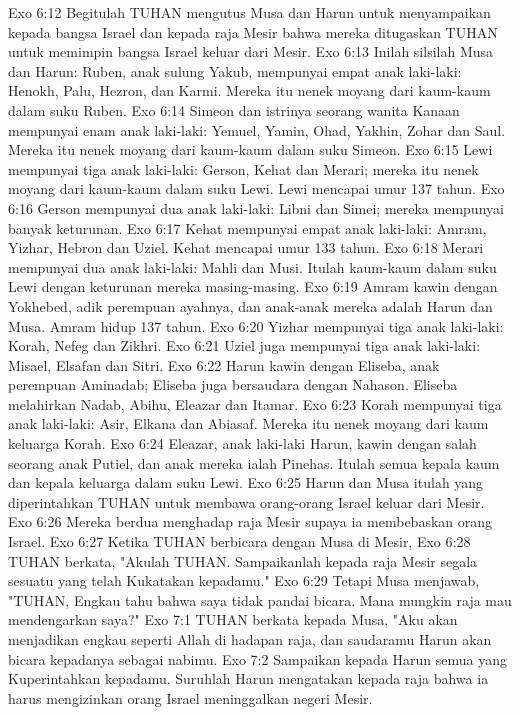Exo 6:12  Begitulah TUHAN mengutus Musa dan Harun untuk menyampaikan kepada bangsa Israel dan kepada raja Mesir bahwa mereka ditugaskan TUHAN untuk memimpin bangsa Israel keluar dari Mesir.
Exo 6:13  Inilah silsilah Musa dan Harun: Ruben, anak sulung Yakub, mempunyai empat anak laki-laki: Henokh, Palu, Hezron, dan Karmi. Mereka itu nenek moyang dari kaum-kaum dalam suku Ruben.
Exo 6:14  Simeon dan istrinya seorang wanita Kanaan mempunyai enam anak laki-laki: Yemuel, Yamin, Ohad, Yakhin, Zohar dan Saul. Mereka itu nenek moyang dari kaum-kaum dalam suku Simeon.
Exo 6:15  Lewi mempunyai tiga anak laki-laki: Gerson, Kehat dan Merari; mereka itu nenek moyang dari kaum-kaum dalam suku Lewi. Lewi mencapai umur 137 tahun.
Exo 6:16  Gerson mempunyai dua anak laki-laki: Libni dan Simei; mereka mempunyai banyak keturunan.
Exo 6:17  Kehat mempunyai empat anak laki-laki: Amram, Yizhar, Hebron dan Uziel. Kehat mencapai umur 133 tahun.
Exo 6:18  Merari mempunyai dua anak laki-laki: Mahli dan Musi. Itulah kaum-kaum dalam suku Lewi dengan keturunan mereka masing-masing.
Exo 6:19  Amram kawin dengan Yokhebed, adik perempuan ayahnya, dan anak-anak mereka adalah Harun dan Musa. Amram hidup 137 tahun.
Exo 6:20  Yizhar mempunyai tiga anak laki-laki: Korah, Nefeg dan Zikhri.
Exo 6:21  Uziel juga mempunyai tiga anak laki-laki: Misael, Elsafan dan Sitri.
Exo 6:22  Harun kawin dengan Eliseba, anak perempuan Aminadab; Eliseba juga bersaudara dengan Nahason. Eliseba melahirkan Nadab, Abihu, Eleazar dan Itamar.
Exo 6:23  Korah mempunyai tiga anak laki-laki: Asir, Elkana dan Abiasaf. Mereka itu nenek moyang dari kaum keluarga Korah.
Exo 6:24  Eleazar, anak laki-laki Harun, kawin dengan salah seorang anak Putiel, dan anak mereka ialah Pinehas. Itulah semua kepala kaum dan kepala keluarga dalam suku Lewi.
Exo 6:25  Harun dan Musa itulah yang diperintahkan TUHAN untuk membawa orang-orang Israel keluar dari Mesir.
Exo 6:26  Mereka berdua menghadap raja Mesir supaya ia membebaskan orang Israel.
Exo 6:27  Ketika TUHAN berbicara dengan Musa di Mesir,
Exo 6:28  TUHAN berkata, "Akulah TUHAN. Sampaikanlah kepada raja Mesir segala sesuatu yang telah Kukatakan kepadamu."
Exo 6:29  Tetapi Musa menjawab, "TUHAN, Engkau tahu bahwa saya tidak pandai bicara. Mana mungkin raja mau mendengarkan saya?"
Exo 7:1  TUHAN berkata kepada Musa, "Aku akan menjadikan engkau seperti Allah di hadapan raja, dan saudaramu Harun akan bicara kepadanya sebagai nabimu.
Exo 7:2  Sampaikan kepada Harun semua yang Kuperintahkan kepadamu. Suruhlah Harun mengatakan kepada raja bahwa ia harus mengizinkan orang Israel meninggalkan negeri Mesir.

